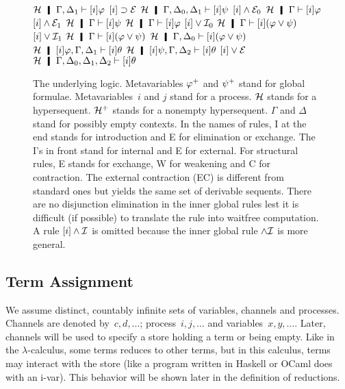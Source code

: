 {\begin{figure}
  {$\hyper\hmid\G,\D_1\vdash [i]\phi$}
  {$[i]\supset\mathcal E$}
  {$\hyper\hmid\G,\D_0,\D_1\vdash [i]\psi$}
  \UnaryRule{$\hyper\hmid\Gamma\vdash [i](\varphi\wedge\psi)$}
   {$[i]\wedge\mathcal E_0$}
   {$\hyper\hmid\Gamma\vdash[i]\varphi$}
   \hfill
  \UnaryRule{$\hyper\hmid\Gamma\vdash[i](\varphi\wedge\psi)$}
   {$[i]\wedge\mathcal E_1$}
   {$\hyper\hmid\Gamma\vdash[i]\psi$}
  \UnaryRule
   {$\hyper\hmid\Gamma\vdash[i]\varphi$}
   {$[i]\vee\mathcal I_0$}
   {$\hyper\hmid\Gamma\vdash[i](\varphi\vee\psi)$}
   \hfill
  \UnaryRule{$\hyper\hmid\Gamma\vdash[i]\psi$}
   {$[i]\vee\mathcal I_1$}
   {$\hyper\hmid\Gamma\vdash[i](\varphi\vee\psi)$}
   \TrinaryRule
   {$\hyper\hmid\G,\D_0\vdash[i](\phi\vee\psi)$}
   {$\hyper\hmid[i]\varphi, \G,\D_1\vdash[i]\theta$}
   {$\hyper\hmid[i]\psi,    \G,\D_2\vdash[i]\theta$}
   {$[i]\vee\mathcal E$}
   {$\hyper\hmid         \G,\D_0,\D_1,\D_2\vdash[i]\theta$}
\caption[The underlying logic .]
 {The underlying logic.
 Metavariables ${\varphi}^+$ and ${\psi}^+$ stand for global formulae.
 Metavariables~$i$ and $j$ stand for a process.
 $\mathcal{H}$ stands for a
 hypersequent.
 $\mathcal{H}^+$ stands for a nonempty hypersequent.
 $\Gamma$ and $\Delta$ stand for possibly empty contexts.
 In the names of rules, I at the end stands for introduction and E for
 elimination or exchange.  The I's in front stand for internal and E
 for external.  For structural rules, E stands for exchange, W for
 weakening and C for contraction.  The external contraction (EC) is
 different from standard ones but yields the same set of derivable
 sequents.
 There are no disjunction elimination in the inner global rules lest it
 is difficult (if possible) to translate the rule into
 waitfree computation.
 A rule $[i]\wedge\mathcal I$ is omitted because the inner global rule
 $\wedge\mathcal I$ is more general.
 }
\label{fig:logic}
\end{figure}

\subsection{Term Assignment}
\label{term}

We assume distinct, countably infinite sets of variables,
channels
and
processes.
Channels are denoted by~$c,d,\ldots$; process~$i,j, \ldots$ and variables~$x,
y, \ldots$.
Later, channels will be used to specify a store
holding a term or being empty.
Like in the $\lambda$-calculus, some terms reduces to other
terms, but in this calculus, terms may interact with the store (like
a program written in Haskell or OCaml does with an i-var).
This behavior will be shown later in the definition of reductions.

}
